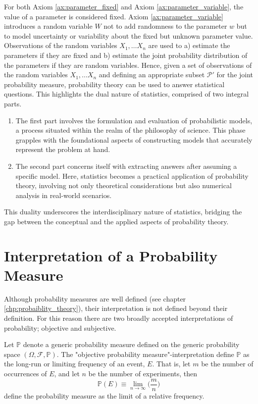 For both Axiom \ref{ax:parameter_fixed} and Axiom \ref{ax:parameter_variable}, the value of a parameter is considered fixed. Axiom \ref{ax:parameter_variable} introduces a random variable $W$ not to add randomness to the parameter $w$ but to model uncertainty or variability about the fixed but unknown parameter value. Observations of the random variables $X_1,\dots X_n$ are used to a) estimate the parameters if they are fixed and b) estimate the joint probability distribution of the parameters if they are random variables. Hence, given a set of observations of the random variables $X_1,\dots X_n$ and defining an appropriate subset $\mathcal{P}'$ for the joint probability measure, probability theory can be used to answer statistical questions. This highlights the dual nature of statistics, comprised of two integral parts.
\begin{enumerate}
	\item The first part involves the formulation and evaluation of probabilistic models, a process situated within the realm of the philosophy of science. This phase grapples with the foundational aspects of constructing models that accurately represent the problem at hand.
	\item The second part concerns itself with extracting answers after assuming a specific model. Here, statistics becomes a practical application of probability theory, involving not only theoretical considerations but also numerical analysis in real-world scenarios.
\end{enumerate}
This duality underscores the interdisciplinary nature of statistics, bridging the gap between the conceptual and the applied aspects of probability theory.  

\section{Interpretation of a Probability Measure} 
Although probability measures are well defined (see chapter \ref{chp:probaiblity_theory}), their interpretation is not defined beyond their definition. For this reason there are two broadly accepted interpretations of probability; objective and subjective. 

\begin{definition}
	\label{def:objective_probability}
	Let $\mathbb{P}$ denote a generic probability measure defined on the generic probability space $(\Omega,\mathcal{F},\mathbb{P})$. The "objective probability measure"-interpretation define $\mathbb{P}$ as the long-run or limiting frequency of an event, $E$. That is, let $m$ be the number of occurrences of $E$, and let $n$ be the number of experiments, then~\cite{Leamer1978}
	\begin{equation}
		\mathbb{P}(E) \equiv \lim_{{n \to \infty}} \bigg(\frac{m}{n}\bigg)
	\end{equation}
	define the probability measure as the limit of a relative frequency.
\end{definition}

